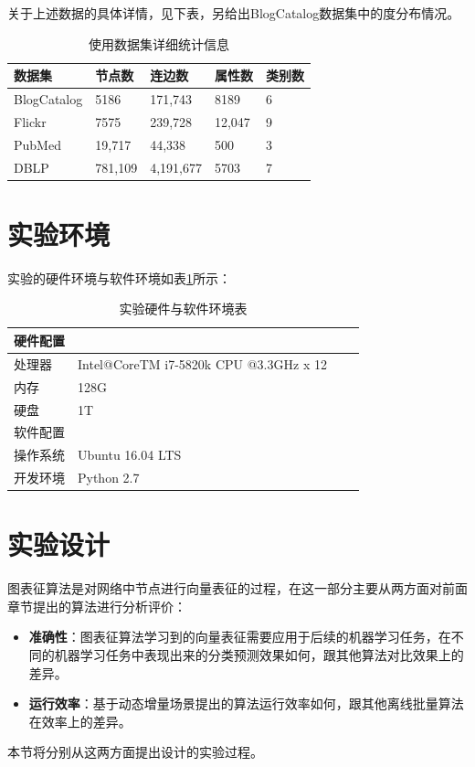 关于上述数据的具体详情，见下表，另给出BlogCatalog数据集中的度分布情况。
\begin{table}
\centering
\caption{使用数据集详细统计信息}
\begin{tabular}{C{1in}C{1in}C{1in}C{1in}C{1in}}
\textbf{数据集} & \textbf{节点数} &\textbf{连边数} & \textbf{属性数}&\textbf{类别数}\\ \hline 
BlogCatalog & 5186  & 171,743 &8189&6\\
Flickr	& 7575 &239,728 & 12,047 & 9 \\
PubMed & 19,717 &44,338&500 &3 \\
DBLP & 781,109 &4,191,677&5703 & 7 \\
\hline

\end{tabular}
\end{table}

\section{实验环境}
实验的硬件环境与软件环境如表\ref{my-label5_1}所示：

\begin{table}[]
	\centering
	\caption{实验硬件与软件环境表}
	\label{my-label5_1}
	\begin{tabular}{@{}llll@{}}
		\toprule
		硬件配置\\ \midrule
		处理器&	Intel@CoreTM i7-5820k CPU @3.3GHz x 12\\ \midrule
		内存&	128G\\ \midrule
		硬盘&	1T\\ \midrule
		软件配置 \\ \midrule
		操作系统&	Ubuntu 16.04 LTS \\ \midrule
		开发环境&	Python 2.7  \\ \bottomrule
	\end{tabular}
\end{table}

\section{实验设计}
图表征算法是对网络中节点进行向量表征的过程，在这一部分主要从两方面对前面章节提出的算法进行分析评价：
\begin{itemize}
	\item \textbf{准确性}：图表征算法学习到的向量表征需要应用于后续的机器学习任务，在不同的机器学习任务中表现出来的分类预测效果如何，跟其他算法对比效果上的差异。
	\item \textbf{运行效率}：基于动态增量场景提出的算法运行效率如何，跟其他离线批量算法在效率上的差异。
\end{itemize}
本节将分别从这两方面提出设计的实验过程。
